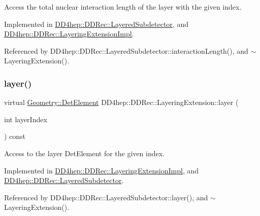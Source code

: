 Access the total nuclear interaction length of the layer with the given index. 



Implemented in \hyperlink{class_d_d4hep_1_1_d_d_rec_1_1_layered_subdetector_a3e106be5eb09693c33502cfebdf95027}{D\+D4hep\+::\+D\+D\+Rec\+::\+Layered\+Subdetector}, and \hyperlink{class_d_d4hep_1_1_d_d_rec_1_1_layering_extension_impl_a7aae4201942d846015d5defa357e2e9d}{D\+D4hep\+::\+D\+D\+Rec\+::\+Layering\+Extension\+Impl}.



Referenced by D\+D4hep\+::\+D\+D\+Rec\+::\+Layered\+Subdetector\+::interaction\+Length(), and $\sim$\+Layering\+Extension().

\hypertarget{class_d_d4hep_1_1_d_d_rec_1_1_layering_extension_a080be80c3277feaa59828b829d29c747}{}\label{class_d_d4hep_1_1_d_d_rec_1_1_layering_extension_a080be80c3277feaa59828b829d29c747} 
\subsubsection{\texorpdfstring{layer()}{layer()}}
{\footnotesize\ttfamily virtual \hyperlink{class_d_d4hep_1_1_geometry_1_1_det_element}{Geometry\+::\+Det\+Element} D\+D4hep\+::\+D\+D\+Rec\+::\+Layering\+Extension\+::layer (\begin{DoxyParamCaption}\item[{int}]{layer\+Index }\end{DoxyParamCaption}) const\hspace{0.3cm}{\ttfamily [pure virtual]}}



Access to the layer Det\+Element for the given index. 



Implemented in \hyperlink{class_d_d4hep_1_1_d_d_rec_1_1_layering_extension_impl_a8bedbd77b80001351451a8cf3bba6a5c}{D\+D4hep\+::\+D\+D\+Rec\+::\+Layering\+Extension\+Impl}, and \hyperlink{class_d_d4hep_1_1_d_d_rec_1_1_layered_subdetector_abdb74d9734f117f22fa64d32895f71fc}{D\+D4hep\+::\+D\+D\+Rec\+::\+Layered\+Subdetector}.



Referenced by D\+D4hep\+::\+D\+D\+Rec\+::\+Layered\+Subdetector\+::layer(), and $\sim$\+Layering\+Extension().

